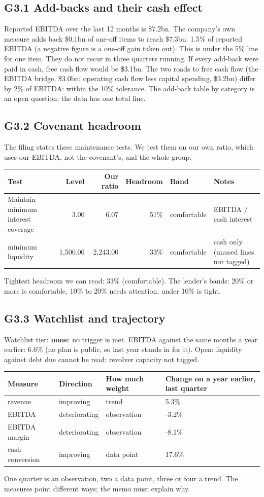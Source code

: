 \documentclass[11pt,a4paper]{article}
\begin{document}
\subsection*{G3.1 Add-backs and their cash effect}
Reported EBITDA over the last 12 months is \$7.2bn. The company's own measure adds back \$0.1bn of one-off items to reach \$7.3bn: 1.5\% of reported EBITDA (a negative figure is a one-off gain taken out). This is under the 5\% line for one item. They do not recur in three quarters running. If every add-back were paid in cash, free cash flow would be \$3.1bn. The two roads to free cash flow (the EBITDA bridge, \$3.0bn; operating cash flow less capital spending, \$3.2bn) differ by 2\% of EBITDA: within the 10\% tolerance. The add-back table by category is an open question: the data has one total line.
\subsection*{G3.2 Covenant headroom}
The filing states these maintenance tests. We test them on our own ratio, which uses our EBITDA, not the covenant's, and the whole group.
\begin{center}\footnotesize\setlength{\tabcolsep}{3.5pt}\begin{tabular}{@{}p{3.8cm}rrrp{1.9cm}p{4.4cm}@{}}\toprule
Test & Level & Our ratio & Headroom & Band & Notes \\\midrule
Maintain minimum interest coverage & 3.00 & 6.07 & 51\% & comfortable & EBITDA / cash interest \\
minimum liquidity & 1,500.00 & 2,243.00 & 33\% & comfortable & cash only (unused lines not tagged) \\
\bottomrule\end{tabular}\end{center}
Tightest headroom we can read: 33\% (comfortable). The lender's bands: 20\% or more is comfortable, 10\% to 20\% needs attention, under 10\% is tight.
\subsection*{G3.3 Watchlist and trajectory}
Watchlist tier: \textbf{none}: no trigger is met. EBITDA against the same months a year earlier: 6.6\% (no plan is public, so last year stands in for it). Open: liquidity against debt due cannot be read: revolver capacity not tagged.
\begin{center}\footnotesize\setlength{\tabcolsep}{3.5pt}\begin{tabular}{@{}llll@{}}\toprule
Measure & Direction & How much weight & Change on a year earlier, last quarter \\\midrule
revenue & improving & trend & 5.3\% \\
EBITDA & deteriorating & observation & -3.2\% \\
EBITDA margin & deteriorating & observation & -8.1\% \\
cash conversion & improving & data point & 17.6\% \\
\bottomrule\end{tabular}\end{center}
One quarter is an observation, two a data point, three or four a trend. The measures point different ways; the memo must explain why.
\end{document}
